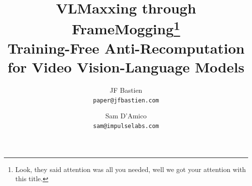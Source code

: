 \documentclass[11pt]{article}
\title{VLMaxxing through FrameMogging\thanks{Look, they said attention was all you needed, well we got your attention with this title.}\\Training-Free Anti-Recomputation for Video Vision-Language Models}
\author{
  JF Bastien\\
  \texttt{paper@jfbastien.com}
  \and
  Sam D'Amico\\
  \texttt{sam@impulselabs.com}
}
\date{\DraftDate}
\begin{document}
\maketitle

\begin{abstract}

\end{abstract}














\appendix

\end{document}
